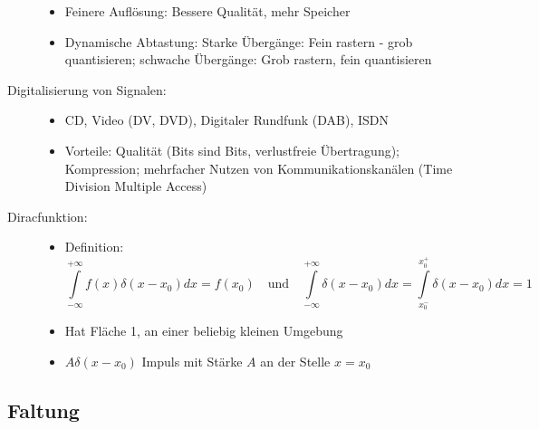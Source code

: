 \begin{description}
\begin{itemize}
\item Feinere Auflösung: Bessere Qualität, mehr Speicher
\item Dynamische Abtastung: Starke Übergänge: Fein rastern - grob quantisieren; schwache Übergänge: Grob rastern, fein quantisieren
\end{itemize}
\item[Digitalisierung von Signalen:] \quad
\begin{itemize}
\item CD, Video (DV, DVD), Digitaler Rundfunk (DAB), ISDN
\item Vorteile: Qualität (Bits sind Bits, verlustfreie Übertragung); Kompression; mehrfacher Nutzen von Kommunikationskanälen (Time Division Multiple Access)
\end{itemize}
\item[Diracfunktion\index{Diracfunktion}:]\quad
\begin{itemize}
\item Definition: $$\int\limits_{- \infty}^{+ \infty} f(x) \delta(x - x_0) dx = f(x_0) \quad \textrm{und} \quad \int\limits_{- \infty}^{+ \infty} \delta(x - x_0) dx = \int\limits_{x_0^-}^{x_0^+} \delta(x - x_0) dx = 1$$
\item Hat Fläche 1, an einer beliebig kleinen Umgebung
\item $A \delta(x - x_0)$ Impuls mit Stärke $A$ an der Stelle $x = x_0$
\end{itemize}
\end{description}

\subsection{Faltung}

